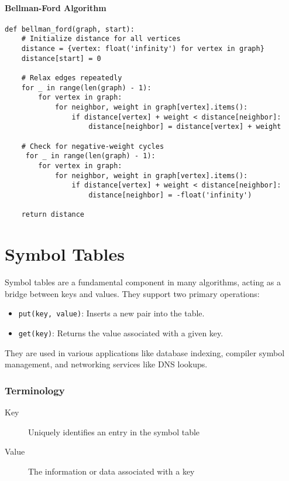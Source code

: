 \documentclass{article}
\begin{document}
\paragraph{Bellman-Ford Algorithm}

\begin{verbatim}
def bellman_ford(graph, start):
    # Initialize distance for all vertices
    distance = {vertex: float('infinity') for vertex in graph}
    distance[start] = 0

    # Relax edges repeatedly
    for _ in range(len(graph) - 1):
        for vertex in graph:
            for neighbor, weight in graph[vertex].items():
                if distance[vertex] + weight < distance[neighbor]:
                    distance[neighbor] = distance[vertex] + weight

    # Check for negative-weight cycles
     for _ in range(len(graph) - 1):
        for vertex in graph:
            for neighbor, weight in graph[vertex].items():
                if distance[vertex] + weight < distance[neighbor]:
                    distance[neighbor] = -float('infinity')

    return distance
\end{verbatim}

\section{Symbol Tables}

Symbol tables are a fundamental component in many algorithms, acting as a bridge between keys and values. They support two primary operations:
\begin{itemize}
    \item \texttt{put(key, value)}: Inserts a new pair into the table.
    \item \texttt{get(key)}: Returns the value associated with a given key.
\end{itemize}

They are used in various applications like database indexing, compiler symbol management, and networking services like DNS lookups.

\subsubsection{Terminology}
\begin{description}
    \item[Key] Uniquely identifies an entry in the symbol table
    \item[Value] The information or data associated with a key
\end{description}
\end{document}
